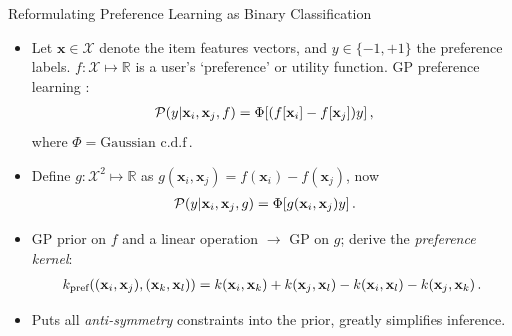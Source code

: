 \documentclass[final]{beamer}
\newlength{\onecolwid}
\newcommand{\x}{\mathbf{x}}
\begin{document}
\begin{frame}[t]
\begin{columns}[t]
\begin{column}{\onecolwid}
      \vskip0.5cm
      \begin{block}{Reformulating Preference Learning as Binary Classification}
      \begin{itemize}
        \item Let $ \mathbf{x}\in\mathcal{X}$ denote the item features vectors, and
        $y\in\{-1,+1\}$ the preference labels.
        $ f:\mathcal{X}\mapsto\mathbb{R}$ is a user's `preference' or utility function.
        GP preference learning \cite{chu2005}:
        \begin{align}
          \mathcal{P}(y|\mathbf{x}_i,\mathbf{x}_j,f) &= \Phi[(f[\mathbf{x}_i] -
            f[\mathbf{x}_j])y]\,, \notag
        \end{align}
        where $\Phi = \text{Gaussian c.d.f}\,.$
        \item Define $g:\mathcal{X}^2\mapsto \mathbb{R}$ as $g(\x_i, \x_j) = f(\x_i) - f(\x_j)$, now
        \begin{align}
          \mathcal{P}(y|\mathbf{x}_i,\mathbf{x}_j,g) &= \Phi[g(\mathbf{x}_i,
          \mathbf{x}_j)y]\,. \notag
        \end{align}
        \item GP prior on $f$ and a linear operation $\rightarrow$ GP on $g$; derive the \emph{preference
          kernel}:
          \begin{align}
            k_\text{pref}((\x_i,\x_j),(\x_k,\x_l)) = k(\x_i,\x_k) + k(\x_j,\x_l) - k(\x_i,\x_l) -
            k(\x_j,\x_k)\,.\notag
          \end{align}
        \item Puts all \emph{anti-symmetry} constraints into the prior, greatly simplifies inference.
        \end{itemize}
      \end{block}


\end{column}
\end{columns}
\end{frame}
\end{document}
